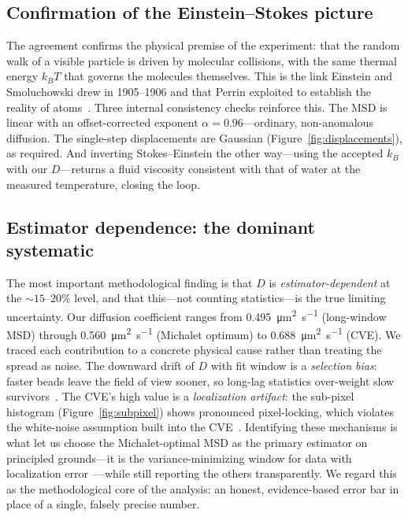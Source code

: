 \documentclass[11pt]{article}
\begin{document}
\subsection{Confirmation of the Einstein--Stokes picture}
\label{ssec:confirm}
The agreement confirms the physical premise of the experiment: that the random walk
of a visible particle is driven by molecular collisions, with the same thermal
energy $k_B T$ that governs the molecules themselves. This is the link Einstein and
Smoluchowski drew in 1905--1906 and that Perrin exploited to establish the reality
of atoms~\cite{einstein1905,perrin1909}. Three internal consistency checks reinforce
this. The MSD is linear with an offset-corrected exponent $\alpha = 0.96$---ordinary,
non-anomalous diffusion. The single-step displacements are Gaussian
(Figure~\ref{fig:displacements}), as required. And inverting Stokes--Einstein the
other way---using the accepted $k_B$ with our $D$---returns a fluid viscosity
consistent with that of water at the measured temperature, closing the loop.

\subsection{Estimator dependence: the dominant systematic}
\label{ssec:estimator}
The most important methodological finding is that $D$ is \emph{estimator-dependent}
at the $\sim$$15$--$20\%$ level, and that this---not counting statistics---is the
true limiting uncertainty. Our diffusion coefficient ranges from
\SI{0.495}{\micro\meter\squared\per\second} (long-window MSD) through
\SI{0.560}{\micro\meter\squared\per\second} (Michalet optimum) to
\SI{0.688}{\micro\meter\squared\per\second} (CVE). We traced each contribution to a
concrete physical cause rather than treating the spread as noise. The downward drift
of $D$ with fit window is a \emph{selection bias}: faster beads leave the field of
view sooner, so long-lag statistics over-weight slow survivors~\cite{qian}. The CVE's
high value is a \emph{localization artifact}: the sub-pixel histogram
(Figure~\ref{fig:subpixel}) shows pronounced pixel-locking, which violates the
white-noise assumption built into the CVE~\cite{vestergaard,berglund}. Identifying
these mechanisms is what let us choose the Michalet-optimal MSD as the primary
estimator on principled grounds---it is the variance-minimizing window for data with
localization error~\cite{michalet2010,michaletberglund}---while still reporting the
others transparently. We regard this as the methodological core of the analysis: an
honest, evidence-based error bar in place of a single, falsely precise number.
\end{document}
